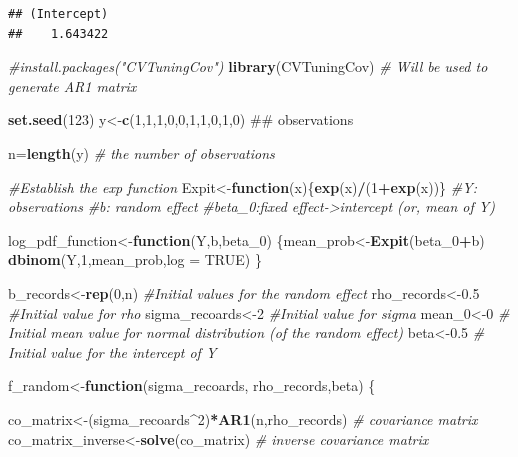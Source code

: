 \documentclass[]{book}
\newenvironment{Shaded}{\begin{snugshade}}{\end{snugshade}}
\newcommand{\KeywordTok}[1]{\textcolor[rgb]{0.13,0.29,0.53}{\textbf{#1}}}
\newcommand{\DataTypeTok}[1]{\textcolor[rgb]{0.13,0.29,0.53}{#1}}
\newcommand{\DecValTok}[1]{\textcolor[rgb]{0.00,0.00,0.81}{#1}}
\newcommand{\FloatTok}[1]{\textcolor[rgb]{0.00,0.00,0.81}{#1}}
\newcommand{\CommentTok}[1]{\textcolor[rgb]{0.56,0.35,0.01}{\textit{#1}}}
\newcommand{\OtherTok}[1]{\textcolor[rgb]{0.56,0.35,0.01}{#1}}
\newcommand{\ControlFlowTok}[1]{\textcolor[rgb]{0.13,0.29,0.53}{\textbf{#1}}}
\newcommand{\OperatorTok}[1]{\textcolor[rgb]{0.81,0.36,0.00}{\textbf{#1}}}
\newcommand{\NormalTok}[1]{#1}
\begin{document}
\begin{verbatim}
## (Intercept) 
##    1.643422
\end{verbatim}

\begin{Shaded}
\begin{Highlighting}[]
\CommentTok{#install.packages("CVTuningCov")}
\KeywordTok{library}\NormalTok{(CVTuningCov) }\CommentTok{# Will be used to generate AR1 matrix}

\KeywordTok{set.seed}\NormalTok{(}\DecValTok{123}\NormalTok{)}
\NormalTok{y<-}\KeywordTok{c}\NormalTok{(}\DecValTok{1}\NormalTok{,}\DecValTok{1}\NormalTok{,}\DecValTok{1}\NormalTok{,}\DecValTok{0}\NormalTok{,}\DecValTok{0}\NormalTok{,}\DecValTok{1}\NormalTok{,}\DecValTok{1}\NormalTok{,}\DecValTok{0}\NormalTok{,}\DecValTok{1}\NormalTok{,}\DecValTok{0}\NormalTok{) ## observations}

\NormalTok{n=}\KeywordTok{length}\NormalTok{(y) }\CommentTok{# the number of observations}


\CommentTok{#Establish the exp function}
\NormalTok{Expit<-}\ControlFlowTok{function}\NormalTok{(x)\{}\KeywordTok{exp}\NormalTok{(x)}\OperatorTok{/}\NormalTok{(}\DecValTok{1}\OperatorTok{+}\KeywordTok{exp}\NormalTok{(x))\}}
\CommentTok{#Y: observations}
\CommentTok{#b: random effect}
\CommentTok{#beta_0:fixed effect->intercept (or, mean of Y)}

\NormalTok{log_pdf_function<-}\ControlFlowTok{function}\NormalTok{(Y,b,beta_}\DecValTok{0}\NormalTok{)}
\NormalTok{  \{mean_prob<-}\KeywordTok{Expit}\NormalTok{(beta_}\DecValTok{0}\OperatorTok{+}\NormalTok{b)}
  \KeywordTok{dbinom}\NormalTok{(Y,}\DecValTok{1}\NormalTok{,mean_prob,}\DataTypeTok{log =} \OtherTok{TRUE}\NormalTok{)}
\NormalTok{  \}}

\NormalTok{b_records<-}\KeywordTok{rep}\NormalTok{(}\DecValTok{0}\NormalTok{,n)  }\CommentTok{#Initial values for the random effect}
\NormalTok{rho_records<-}\FloatTok{0.5} \CommentTok{#Initial value for rho}
\NormalTok{sigma_recoards<-}\DecValTok{2}  \CommentTok{#Initial value for sigma}
\NormalTok{mean_}\DecValTok{0}\NormalTok{<-}\DecValTok{0} \CommentTok{# Initial mean value for normal distribution (of the random effect)}
\NormalTok{beta<-}\FloatTok{0.5} \CommentTok{# Initial value for the intercept of Y}


\NormalTok{f_random<-}\ControlFlowTok{function}\NormalTok{(sigma_recoards, rho_records,beta)}
\NormalTok{\{}
  
\NormalTok{co_matrix<-(sigma_recoards}\OperatorTok{^}\DecValTok{2}\NormalTok{)}\OperatorTok{*}\KeywordTok{AR1}\NormalTok{(n,rho_records) }\CommentTok{# covariance matrix}
\NormalTok{co_matrix_inverse<-}\KeywordTok{solve}\NormalTok{(co_matrix)  }\CommentTok{# inverse covariance matrix}



\end{Highlighting}
\end{Shaded}
\end{document}
